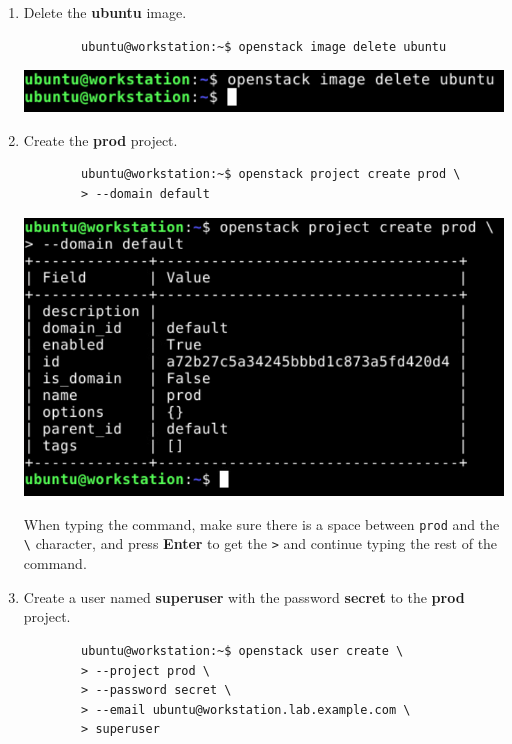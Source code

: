 \documentclass[letterpaper, 12pt]{article}
\begin{document}
\begin{enumerate}
    \item Delete the \textbf{ubuntu} image.
    \begin{lstlisting}
        ubuntu@workstation:~$ openstack image delete ubuntu
    \end{lstlisting}

    \begin{center}
        \includegraphics[width=\linewidth]{images/part1/step4.png}
    \end{center}

    \item Create the \textbf{prod} project.
    \begin{lstlisting}
        ubuntu@workstation:~$ openstack project create prod \
        > --domain default
    \end{lstlisting}

    \begin{center}
        \includegraphics[width=\linewidth]{images/part1/step5.png}
    \end{center}

    \begin{tipbox}
        When typing the command, make sure there is a space between \texttt{prod} and the \texttt{\textbackslash}
        character, and press \textbf{Enter} to get the \texttt{>} and continue typing the rest of the command.
    \end{tipbox}

    \item Create a user named \textbf{superuser} with the password \textbf{secret} to the \textbf{prod} project.
    \begin{lstlisting}
        ubuntu@workstation:~$ openstack user create \
        > --project prod \
        > --password secret \
        > --email ubuntu@workstation.lab.example.com \
        > superuser
    \end{lstlisting}


\end{enumerate}
\end{document}
